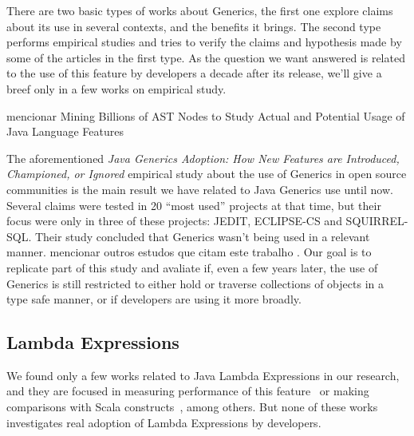 \documentclass{sig-alternate-05-2015}
\begin{document}
There are two basic types of works about Generics, the first one explore claims about its use in several contexts, and the benefits it brings. The second type performs empirical studies and tries to verify the claims and hypothesis made by some of the articles in the first type.
As the question we want answered is related to the use of this feature by developers a decade after its release, we'll give a breef only in a few works on empirical study.

{\color{blue} mencionar Mining Billions of AST Nodes to Study Actual and
Potential Usage of Java Language Features }

The aforementioned \textit{ 
Java Generics Adoption: How New Features are
Introduced, Championed, or Ignored
} empirical study about the use of Generics in open source communities is the main result we have related to Java Generics use until now. Several claims were tested in 20 ``most used'' projects at that time, but their focus were only in three of these projects: JEDIT, ECLIPSE-CS and SQUIRREL-SQL.
Their study concluded that Generics wasn't being used in a relevant manner.
{\color{blue} mencionar outros estudos que citam este trabalho }.
Our goal is to replicate part of this study and avaliate if, even a few years later, the use of Generics is still restricted to either hold or traverse collections of objects in a type safe manner, or if developers are using it more broadly.

\subsection{Lambda Expressions}

We found only a few works related to Java Lambda Expressions in our research, and they are focused in measuring performance of this feature~\cite{} or making comparisons with Scala constructs~\cite{}, among others. But none of these works investigates real adoption of Lambda Expressions by developers.


\end{document}
